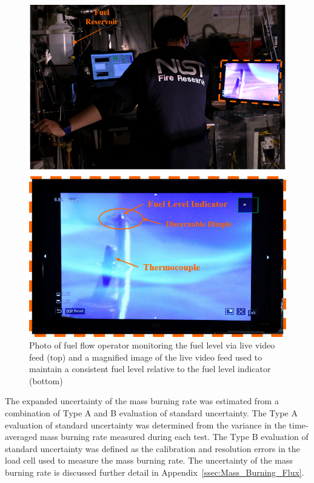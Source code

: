\documentclass[12pt]{article}
\begin{document}
\begin{figure}[h!]
	\centering
\includegraphics[width=14.0cm,keepaspectratio]{Monitoring_Fuel_Level_A.png}
	\caption[Photo of fuel flow operator monitoring the fuel level via live video feed (top) and a magnified image of the live video feed used to maintain a consistent fuel level relative to the fuel level indicator (bottom)]{Photo of fuel flow operator monitoring the fuel level via live video feed (top) and a magnified image of the live video feed used to maintain a consistent fuel level relative to the fuel level indicator (bottom)}
	\label{fig:Fuel_Level}
\end{figure}

The expanded uncertainty of the mass burning rate was estimated from a combination of Type A and B evaluation of standard uncertainty. The Type A evaluation of standard uncertainty was determined from the variance in the time-averaged mass burning rate measured during each test. The Type B evaluation of standard uncertainty was defined as the calibration and resolution errors in the load cell used to measure the mass burning rate. The uncertainty of the mass burning rate is discussed further detail in Appendix~\ref{ssec:Mass_Burning_Flux}.
\end{document}
